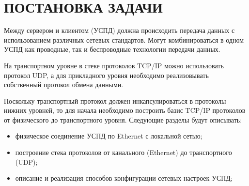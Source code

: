 \newpage

\section{ПОСТАНОВКА ЗАДАЧИ}

Между сервером и клиентом (УСПД) должна происходить передача данных с использованием различных сетевых стандартов. Могут комбинироваться в одном УСПД как проводные, так и беспроводные технологии передачи данных.

На транспортном уровне в стеке протоколов TCP/IP можно использовать протокол UDP, а для прикладного уровня необходимо реализовывать собственный протокол обмена данными. 

Поскольку транспортный протокол должен инкапсулироваться в протоколы нижних уровней, то для начала необходимо построить базис TCP/IP протоколов от физического до транспортного уровня. Следующие разделы будут описывать:
\begin{itemize}
\item физическое соединение УСПД по Ethernet с локальной сетью;
\item построение стека протоколов от канального (Ethernet) до транспортного (UDP);
\item описание и реализация способов конфигурации сетевых настроек УСПД;
\end{itemize}


